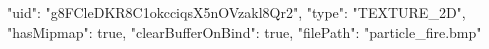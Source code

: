 {
    "uid": "g8FCleDKR8C1okcciqsX5nOVzakl8Qr2",
    "type": "TEXTURE_2D",
    "hasMipmap": true,
    "clearBufferOnBind": true,
    "filePath": "particle_fire.bmp"
}
